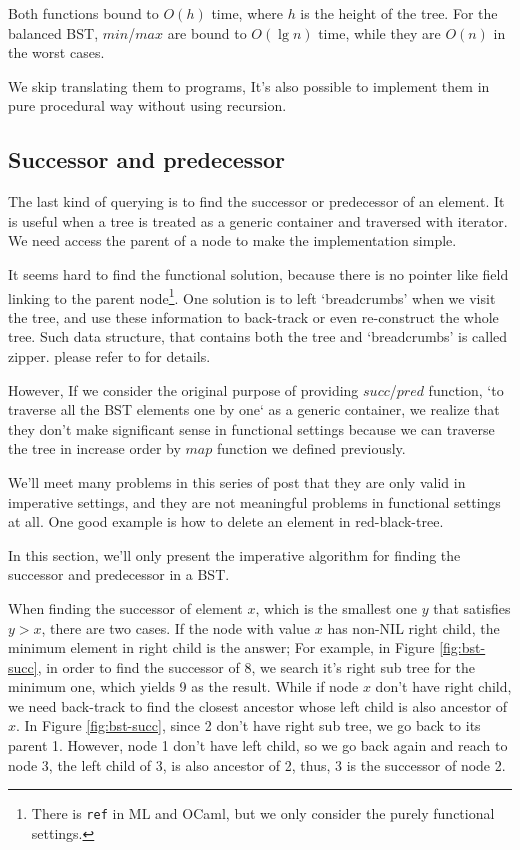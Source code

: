 \documentclass{article}
\begin{document}
Both functions bound to $O(h)$ time, where $h$ is the height of the tree.
For the balanced BST, $min$/$max$ are bound to $O(\lg n)$ time,
while they are $O(n)$ in the worst cases.

We skip translating them to programs, It's also possible to implement them
in pure procedural way without using recursion.

\subsection{Successor and predecessor}

The last kind of querying is to find the successor or predecessor of an element.
It is useful when a tree is treated as a generic container and traversed with
iterator. We need access the parent of a node to make the implementation
simple.

It seems hard to find the functional solution, because there
is no pointer like field linking to the parent node\footnote{There is \texttt{ref} in ML and OCaml, but we only consider the purely functional settings.}. One solution is
to left `breadcrumbs' when we visit the tree, and use these information
to back-track or even re-construct the whole tree. Such data structure,
that contains both the tree and `breadcrumbs' is called zipper.
please refer to \cite{zipper-hbook} for details.

However, If we consider
the original purpose of providing $succ$/$pred$ function, `to traverse all the
BST elements one by one` as a generic container, we realize
that they don't make significant sense in functional settings because
we can traverse the tree in increase order by $map$ function we defined
previously.

We'll meet many problems in this series of post that they are only valid
in imperative settings, and they are not meaningful problems in functional
settings at all. One good example is how to delete an element in
red-black-tree\cite{okasaki-blog}.

In this section, we'll only present the imperative algorithm for finding
the successor and predecessor in a BST.

When finding the successor of element $x$, which is the smallest one $y$
that satisfies $y > x$, there are two cases. If the node with value $x$
has non-NIL right child, the minimum element in right child is the answer;
For example, in Figure \ref{fig:bst-succ}, in order to find the successor
of 8, we search it's right sub tree for the minimum one, which yields 9
as the result. While if node $x$ don't have right child, we need
back-track to find the closest ancestor whose left child is also ancestor
of $x$. In Figure \ref{fig:bst-succ}, since 2 don't have right sub tree,
we go back to its parent 1. However, node 1 don't have left child, so we
go back again and reach to node 3, the left child of 3, is also ancestor
of 2, thus, 3 is the successor of node 2.
\end{document}
